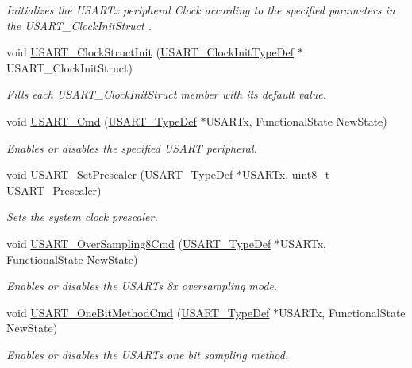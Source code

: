 \begin{DoxyCompactItemize}
\begin{DoxyCompactList}\small\item\em Initializes the U\+S\+A\+R\+Tx peripheral Clock according to the specified parameters in the U\+S\+A\+R\+T\+\_\+\+Clock\+Init\+Struct . \end{DoxyCompactList}\item 
void \hyperlink{group___u_s_a_r_t___group1_ga59df27d0adda18b16ee28d47672cc724}{U\+S\+A\+R\+T\+\_\+\+Clock\+Struct\+Init} (\hyperlink{struct_u_s_a_r_t___clock_init_type_def}{U\+S\+A\+R\+T\+\_\+\+Clock\+Init\+Type\+Def} $\ast$U\+S\+A\+R\+T\+\_\+\+Clock\+Init\+Struct)
\begin{DoxyCompactList}\small\item\em Fills each U\+S\+A\+R\+T\+\_\+\+Clock\+Init\+Struct member with its default value. \end{DoxyCompactList}\item 
void \hyperlink{group___u_s_a_r_t___group1_ga45e51626739c5f22a6567c8a85d1d85e}{U\+S\+A\+R\+T\+\_\+\+Cmd} (\hyperlink{struct_u_s_a_r_t___type_def}{U\+S\+A\+R\+T\+\_\+\+Type\+Def} $\ast$U\+S\+A\+R\+Tx, Functional\+State New\+State)
\begin{DoxyCompactList}\small\item\em Enables or disables the specified U\+S\+A\+RT peripheral. \end{DoxyCompactList}\item 
void \hyperlink{group___u_s_a_r_t___group1_gaf5da8f2eee8245425584d85d4f62cc33}{U\+S\+A\+R\+T\+\_\+\+Set\+Prescaler} (\hyperlink{struct_u_s_a_r_t___type_def}{U\+S\+A\+R\+T\+\_\+\+Type\+Def} $\ast$U\+S\+A\+R\+Tx, uint8\+\_\+t U\+S\+A\+R\+T\+\_\+\+Prescaler)
\begin{DoxyCompactList}\small\item\em Sets the system clock prescaler. \end{DoxyCompactList}\item 
void \hyperlink{group___u_s_a_r_t___group1_ga3897bab07491d9239f8a238a9a7cddea}{U\+S\+A\+R\+T\+\_\+\+Over\+Sampling8\+Cmd} (\hyperlink{struct_u_s_a_r_t___type_def}{U\+S\+A\+R\+T\+\_\+\+Type\+Def} $\ast$U\+S\+A\+R\+Tx, Functional\+State New\+State)
\begin{DoxyCompactList}\small\item\em Enables or disables the U\+S\+A\+RT\textquotesingle{}s 8x oversampling mode. \end{DoxyCompactList}\item 
void \hyperlink{group___u_s_a_r_t___group1_ga3ed89ea8765d851510cfe90f7d90cbbb}{U\+S\+A\+R\+T\+\_\+\+One\+Bit\+Method\+Cmd} (\hyperlink{struct_u_s_a_r_t___type_def}{U\+S\+A\+R\+T\+\_\+\+Type\+Def} $\ast$U\+S\+A\+R\+Tx, Functional\+State New\+State)
\begin{DoxyCompactList}\small\item\em Enables or disables the U\+S\+A\+RT\textquotesingle{}s one bit sampling method. \end{DoxyCompactList}\end{DoxyCompactItemize}



